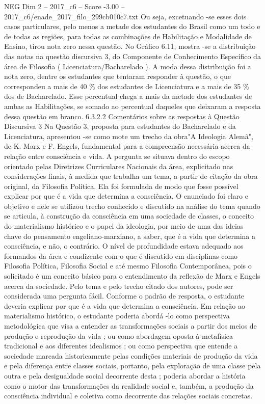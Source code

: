 \begin{textsample}{NEG Dim 2 – 2017\_c6 – Score -3.00 – 2017\_c6/enade\_2017\_filo\_299cb010c7.txt}
Ou seja, excetuando -se esses dois casos particulares, pelo menos a metade dos estudantes do Brasil como um todo e de todas as regiões, para todas as combinações de Habilitação e Modalidade de Ensino, tirou nota zero nessa questão.
No Gráfico 6.11, mostra -se a distribuição das notas na questão discursiva 3, do Componente de Conhecimento Específico da área de Filosofia ( Licenciatura/Bacharelado ).
A moda dessa distribuição foi a nota zero, dentre os estudantes que tentaram responder à questão, o que correspondeu a mais de 40 \% dos estudantes de Licenciatura e a mais de 35 \% dos de Bacharelado.
Esse percentual chega a mais da metade dos estudantes de ambas as Habilitações, se somado ao percentual daqueles que deixaram a resposta dessa questão em branco. 6.3.2.2 Comentários sobre as respostas à Questão Discursiva 3 Na Questão 3, proposta para estudantes do Bacharelado e da Licenciatura, apresentou -se como mote um trecho da obra"A Ideologia Alemã", de K.
Marx e F.
Engels, fundamental para a compreensão necessária acerca da relação entre consciência e vida.
A pergunta se situava dentro do escopo orientado pelas Diretrizes Curriculares Nacionais da área, explicitado nas considerações finais, à medida que trabalha um tema, a partir de citação da obra original, da Filosofia Política.
Ela foi formulada de modo que fosse possível explicar por que é a vida que determina a consciência.
O enunciado foi claro e objetivo e nele se utilizou trecho conhecido e discutido na análise do tema quando se articula, à construção da consciência em uma sociedade de classes, o conceito do materialismo histórico e o papel da ideologia, por meio de uma das ideias chave do pensamento engeliano-marxiano, a saber, que é a vida que determina a consciência, e não, o contrário.
O nível de profundidade estava adequado aos formandos da área e condizente com o que é discutido em disciplinas como Filosofia Política, Filosofia Social e até mesmo Filosofia Contemporânea, pois o solicitado é um conceito básico para o entendimento da reflexão de Marx e Engels acerca da sociedade.
Pelo tema e pelo trecho citado dos autores, pode ser considerada uma pergunta fácil.
Conforme o padrão de resposta, o estudante deveria explicar por que é a vida que determina a consciência.
Em relação ao materialismo histórico, o estudante poderia abordá -lo como perspectiva metodológica que visa a entender as transformações sociais a partir dos meios de produção e reprodução da vida ; ou como abordagem oposta à metafísica tradicional e aos diferentes idealismos ; ou como perspectiva que entende a sociedade marcada historicamente pelas condições materiais de produção da vida e pela diferença entre classes sociais, portanto, pela exploração de uma classe pela outra e pela desigualdade social decorrente desta ; poderia abordar a história como o motor das transformações da realidade social e, também, a produção da consciência individual e coletiva como decorrente das relações sociais concretas.

\end{textsample}
